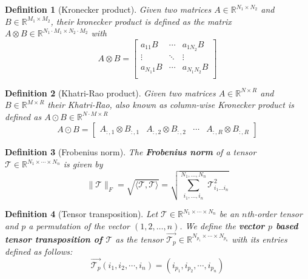 \documentclass[11pt,a4paper,openright,oneside]{book}
\numberwithin{equation}{section}
\newtheorem{defn0}{Definition}[chapter]
\newenvironment{definition}{ \begin{defn0}}{\end{defn0}}
\begin{document}
\begin{definition}[Kronecker product]
     Given two matrices $A \in \mathbb{R}^{N_1 \times N_2}$ and $B \in \mathbb{R}^{M_1 \times M_2}$,
    their kronecker product is defined as the matrix $A \otimes B \in \mathbb{R}^{N_1 \cdot M_1 \times N_2 \cdot M_2}$ with
    $$A \otimes B = \begin{bmatrix}
        a_{11}B & \cdots & a_{1N_2}B \\ 
        \vdots & \ddots & \vdots \\
        a_{N_1 1}B & \cdots & a_{N_1 N_2}B \\
    \end{bmatrix}$$
\end{definition}

\begin{definition}[Khatri-Rao product]
     Given two matrices $A \in \mathbb{R}^{N \times R}$ and $B \in \mathbb{R}^{M \times R}$ their
Khatri-Rao, also known as column-wise Kronecker product is defined as $A \odot B \in \mathbb{R}^{N \cdot M \times R}$
    $$ A \odot B = \begin{bmatrix} A_{:,1} \otimes B_{:,1} & A_{:,2} \otimes B_{:,2} & \cdots & A_{:,R} \otimes B_{:,R}  \end{bmatrix}$$
        

\end{definition}

\begin{definition}[Frobenius norm]
The \textbf{Frobenius norm} of a tensor $\mathcal{T} \in \mathbb{R}^{N_1 \times \cdots \times N_n}$ is given by
$$\|\mathcal{T}\|_F = \sqrt{\langle \mathcal{T}, \mathcal{T} \rangle} = \sqrt{\sum_{i_1, \dots, i_n}^{N_1, \dots, N_n}
\mathcal{T}_{i_1 \dots i_n}^2}$$
\end{definition}

\begin{definition}[Tensor transposition]
     Let $\mathcal{T} \in \mathbb{R}^{N_1 \times \cdots \times N_n}$
    be an $n$th-order tensor and $p$ a permutation of the vector $(1, 2, \dots, n)$. We define the \textbf{vector $p$ based tensor
    transposition of $\mathcal{T}$} as the tensor $\overrightarrow{\mathcal{T}_p} \in \mathbb{R}^{N_{p_1} \times \cdots \times N_{p_n}}$ with its entries defined as follows:
    $$\overrightarrow{\mathcal{T}_p}(i_1, i_2, \cdots, i_n) = (i_{p_1}, i_{p_2}, \cdots, i_{p_n})$$
\end{definition}
\end{document}
